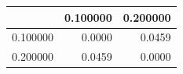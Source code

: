 \begin{tabular}{lrr}
\toprule
 & 0.100000 & 0.200000 \\
\midrule
0.100000 & 0.0000 & 0.0459 \\
0.200000 & 0.0459 & 0.0000 \\
\bottomrule
\end{tabular}
